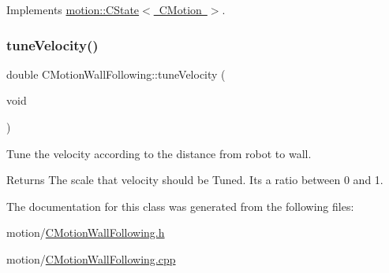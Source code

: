 Implements \mbox{\hyperlink{classmotion_1_1CState_a353db064c159d66b82bf257b35e7c016}{motion\+::\+C\+State$<$ C\+Motion $>$}}.

\mbox{\label{classmotion_1_1CMotionWallFollowing_a1b29295eff775104bb16c110c3f8b81a}} 
\subsubsection{\texorpdfstring{tune\+Velocity()}{tuneVelocity()}}
{\footnotesize\ttfamily double C\+Motion\+Wall\+Following\+::tune\+Velocity (\begin{DoxyParamCaption}\item[{void}]{ }\end{DoxyParamCaption})}

Tune the velocity according to the distance from robot to wall. \begin{DoxyReturn}{Returns}
The scale that velocity should be Tuned. It\textquotesingle{}s a ratio between 0 and 1. 
\end{DoxyReturn}


The documentation for this class was generated from the following files\+:\begin{DoxyCompactItemize}
\item 
motion/\mbox{\hyperlink{CMotionWallFollowing_8h}{C\+Motion\+Wall\+Following.\+h}}\item 
motion/\mbox{\hyperlink{CMotionWallFollowing_8cpp}{C\+Motion\+Wall\+Following.\+cpp}}\end{DoxyCompactItemize}
